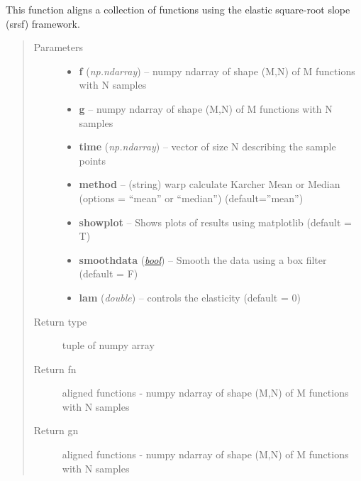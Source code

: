 \documentclass[letterpaper,10pt,english]{sphinxmanual}
\begin{document}

\begin{fulllineitems}
\label{time_warping:time_warping.srsf_align_pair}
This function aligns a collection of functions using the elastic square-root slope (srsf) framework.
\begin{quote}\begin{description}
\item[{Parameters}] \leavevmode\begin{itemize}
\item {} 
\textbf{f} (\emph{np.ndarray}) -- numpy ndarray of shape (M,N) of M functions with N samples

\item {} 
\textbf{g} -- numpy ndarray of shape (M,N) of M functions with N samples

\item {} 
\textbf{time} (\emph{np.ndarray}) -- vector of size N describing the sample points

\item {} 
\textbf{method} -- (string) warp calculate Karcher Mean or Median (options = ``mean'' or ``median'') (default=''mean'')

\item {} 
\textbf{showplot} -- Shows plots of results using matplotlib (default = T)

\item {} 
\textbf{smoothdata} (\href{http://docs.python.org/library/functions.html\#bool}{\emph{bool}}) -- Smooth the data using a box filter (default = F)

\item {} 
\textbf{lam} (\emph{double}) -- controls the elasticity (default = 0)

\end{itemize}

\item[{Return type}] \leavevmode
tuple of numpy array

\item[{Return fn}] \leavevmode
aligned functions - numpy ndarray of shape (M,N) of M functions with N samples

\item[{Return gn}] \leavevmode
aligned functions - numpy ndarray of shape (M,N) of M functions with N samples


\end{description}
\end{quote}
\end{fulllineitems}
\end{document}
